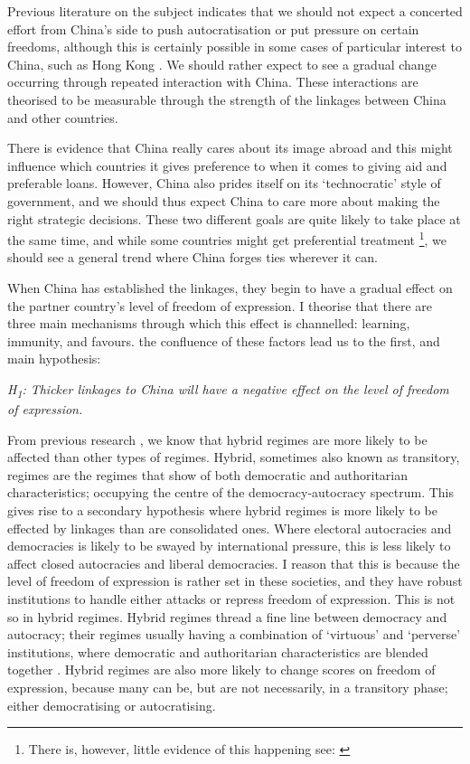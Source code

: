 Previous literature on the subject indicates that we should not expect a concerted effort from China's side to push autocratisation or put pressure on certain freedoms, although this is certainly possible in some cases of particular interest to China, such as Hong Kong \citep{chen_democracy_2015}. We should rather expect to see a gradual change occurring through repeated interaction with China. These interactions are theorised to be measurable through the strength of the linkages between China and other countries.

There is evidence that China really cares about its image abroad and this might influence which countries it gives preference to when it comes to giving aid and preferable loans. However, China also prides itself on its `technocratic' style of government, and we should thus expect China to care more about making the right strategic decisions. These two different goals are quite likely to take place at the same time, and while some countries might get preferential treatment \footnote{There is, however, little evidence of this happening see: \citet{brand_authoritarian_2015}}, we should see a general trend where China forges ties wherever it can.

When China has established the linkages, they begin to have a gradual effect on the partner country's level of freedom of expression. I theorise that there are three main mechanisms through which this effect is channelled: learning, immunity, and favours. the confluence of these factors lead us to the first, and main hypothesis:
\begin{displayquote}
    \textit{H\textsubscript{1}: Thicker linkages to China will have a negative effect on the level of freedom of expression.}  
\end{displayquote}
From previous research \citep{toettoe_foreign_2023}, we know that hybrid regimes are more likely to be affected than other types of regimes. Hybrid, sometimes also known as transitory, regimes are the regimes that show of both democratic and authoritarian characteristics; occupying the centre of the democracy-autocracy spectrum. This gives rise to a secondary hypothesis where hybrid regimes is more likely to be effected by linkages than are consolidated ones. Where electoral autocracies and democracies is likely to be swayed by international pressure, this is less likely to affect closed autocracies and liberal democracies. I reason that this is because the level of freedom of expression is rather set in these societies, and they have robust institutions to handle either attacks or repress freedom of expression. This is not so in hybrid regimes. Hybrid regimes thread a fine line between democracy and autocracy; their regimes usually having a combination of `virtuous' and `perverse' institutions, where democratic and authoritarian characteristics are blended together \citep{valenzuela_democratic_1990}. Hybrid regimes are also more likely to change scores on freedom of expression, because many can be, but are not necessarily, in a transitory phase; either democratising or autocratising.

